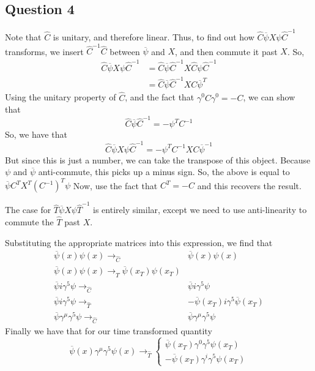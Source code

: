 \documentclass[11pt, oneside]{article}   	%
\theoremstyle{slanted}
\begin{document}
\subsection*{Question 4}
Note that $ \hat{ C } $ is unitary, 
and therefore linear. 
Thus, to find out how 
$ \hat{ C } \overline{ \psi } X \psi \hat{ C } ^{  -1 } $ 
transforms, 
we insert $ \hat{ C }^{  -1  }  \hat{ C }$ between 
$ \overline{ \psi } $ and $ X $, and then 
commute it past $ X $. 
So, 
\begin{align*}
	\hat{ C } \overline{ \psi} X \psi \hat{ C } ^{  -1  } &=  
	\hat{ C  } \overline{ \psi } \hat{ C } ^{  -1  } X \hat{ C } 
	\psi \hat{ C } ^{  -1  } \\ 
	&=  \hat{ C } \overline{ \psi } \hat{ C } ^{  -1  } X C \overline{ \psi } 
	^{ T } 
\end{align*}
Using the unitary property of $ \hat{ C }$,
and the fact that $ \gamma ^  0  C \gamma ^ 0  =  - C $, 
we can show that  \[
 \hat{ C } \overline{ \psi } \hat{ C } ^{  -1 }  = - \psi ^  T C^{  -1 } 
\]
So, we have that 
\[
 \hat{ C } \overline{ \psi  } X \psi \hat{ C } ^{  -1 }  = 
  - \psi ^ T C ^{  -1  } X C \overline{ \psi } ^{  -1  } 
\] But since this is just a number, 
we can take the transpose of this object. 
Because $ \psi $ and $ \overline{ \psi } $ 
anti-commute, this picks up a minus sign. 
So, the above is equal to $ \overline{ \psi } C ^ T X ^ T \left( C ^{-1} \right) ^ T \psi  $
Now, use the fact that $ C ^ T  = - C $ and this recovers 
the result.

The case for $ \hat{ T } \overline{ \psi  } X \psi \hat{ T } ^{ - 1 }  $ 
is entirely similar, except we need to 
use anti-linearity to commute the $ \hat{ T } $ past $X  $.

Substituting the appropriate 
matrices into this expression, 
we find that
\begin{align*}
	\overline{ \psi } \left(  x  \right)  \psi \left( x  \right)  
	\to_{ \hat{ C } } & \overline{ \psi } \left( x  \right)  \psi ( x ) \\
	\overline{ \psi } \left( x  \right)  \psi \left( x  \right)  
	\to _{ \hat{ T }} \overline{ \psi } \left( x _ T  \right)  \psi 
	\left( x  _ T  \right) \\
	\overline{ \psi } i \gamma ^ 5 \psi \to_{ \hat{ C } } & 
	\overline{\psi } i \gamma ^ 5 \psi \\
	\overline{ \psi } i \gamma ^ 5 \psi \to_{ \hat{ T } } & 
	- \overline{ \psi } \left( x _ T  \right)  i \gamma ^ 5 
	\overline{ \psi } \left(  x _ T  \right)  \\
	\overline{ \psi }\gamma ^ \mu \gamma ^ 5 \psi 
	\to_{ \hat{ C }  } & \overline{ \psi } \gamma ^ \mu \gamma ^ 5 \psi 	 
\end{align*}  
Finally we have that 
for our time transformed quantity
\[
	\overline{ \psi } \left(   x  \right)  \gamma ^ \mu \gamma ^ 5 
	\psi \left(  x  \right)  \to _{ \hat{ T }  } \begin{cases}
		\overline{ \psi } \left( x _ T  \right)  \gamma ^  0 
		\gamma ^ 5 \psi \left( x _ T  \right)  \\ 
		- \overline{ \psi } \left( x _ T  \right)  \gamma ^ i 
		\gamma ^ 5 \psi \left( x _ T  \right) 
	\end{cases}
\] 
\end{document}
